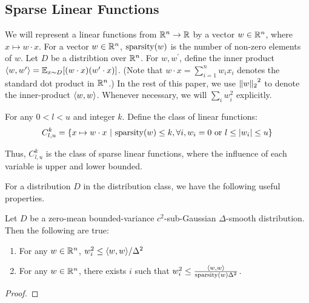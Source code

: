 \subsection{Sparse Linear Functions} 

We will represent a linear functions from $\mathbb{R}^n \rightarrow \mathbb{R}$ by a
vector $w \in \mathbb{R}^n$, where $x \mapsto w \cdot x$.  For a vector $w \in
\mathbb{R}^n$, $\mathrm{sparsity}(w)$ is the number of non-zero elements of $w$. Let $D$ be a
distribtion over $\mathbb{R}^n$. For $w, w^\prime$, define the inner product
$\langle w, w^\prime \rangle = \mathbb{E}_{x \sim D}[(w \cdot x) (w^\prime \cdot x)]$. (Note that
$w \cdot x = \sum_{i = 1}^n w_i x_i$ denotes the standard dot product in
$\mathbb{R}^n$.) In the rest of this paper, we use ${\Vert w \Vert_{2}}^2$ to denote the
inner-product $\langle w, w \rangle$. Whenever necessary, we will $\sum_{i} w_i^2$
explicitly.

For any $0 < l < u$ and integer $k$. Define the class of linear functions:
\[
C^k_{l, u} = \{ x \mapsto w \cdot x ~|~ \mathrm{sparsity}(w) \leq k, \forall i,
w_i = 0 \mbox{ or } l \leq |w_i| \leq u \}
\]

Thus, $C^k_{l, u}$ is the class of sparse linear functions, where the influence
of each variable is upper and lower bounded.

For a distribution $D$ in the distribution class, we have the following useful
properties. 
\begin{lemma} Let $D$ be a zero-mean bounded-variance $c^2$-sub-Gaussian
$\Delta$-smooth distribution. Then the following are true:
\begin{enumerate}
\item For any $w \in \mathbb{R}^n$, $w^2_i \leq \langle w, w \rangle/\Delta^2$
\item For any $w \in \mathbb{R}^n$, there exists $i$ such that $w^2_i \leq
\frac{\langle w, w \rangle}{\mathrm{sparsity}(w)\Delta^2}$.
\end{enumerate}
\end{lemma}
\begin{proof}

\end{proof}



